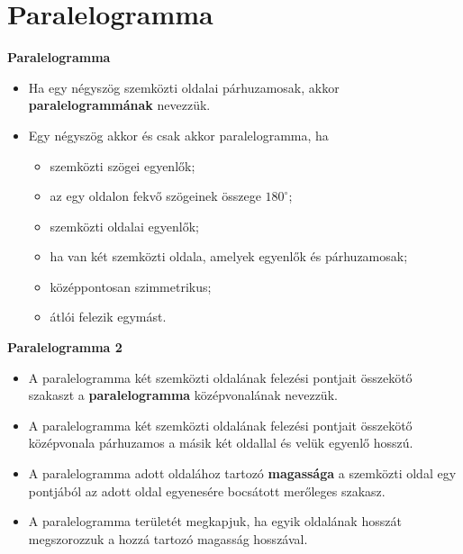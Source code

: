 \documentclass[11pt]{beamer}
\begin{document}
\section{\textbf{Paralelogramma}}
\begin{frame}[<+->]
\begin{block}{\textbf{Paralelogramma}}
\begin{itemize}[label=$\circ$]
\item Ha egy négyszög szemközti oldalai párhuzamosak, akkor \textbf{paralelogrammának} nevezzük.
\item Egy négyszög akkor és csak akkor paralelogramma, ha
\begin{itemize}[label=$\cdot$]
\item szemközti szögei egyenlők;
\item az egy oldalon fekvő szögeinek összege $180^\circ$;
\item szemközti oldalai egyenlők;
\item ha van két szemközti oldala, amelyek egyenlők és párhuzamosak;
\item középpontosan szimmetrikus;
\item átlói felezik egymást.
\end{itemize}
\end{itemize}
\end{block}
\end{frame}

\begin{frame}[<+->]
\begin{block}{\textbf{Paralelogramma 2}}
\begin{itemize}[label=$\circ$]
\item A paralelogramma két szemközti oldalának felezési pontjait összekötő szakaszt a \textbf{paralelogramma} középvonalának nevezzük.
\item A paralelogramma két szemközti oldalának felezési pontjait összekötő középvonala párhuzamos a másik két oldallal és velük egyenlő hosszú.
\item A paralelogramma adott oldalához tartozó \textbf{magassága} a szemközti oldal egy pontjából az
adott oldal egyenesére bocsátott merőleges szakasz.
\item A paralelogramma területét megkapjuk, ha egyik oldalának hosszát megszorozzuk a hozzá tartozó magasság hosszával.
\end{itemize}
\end{block}
\end{frame}
\end{document}

